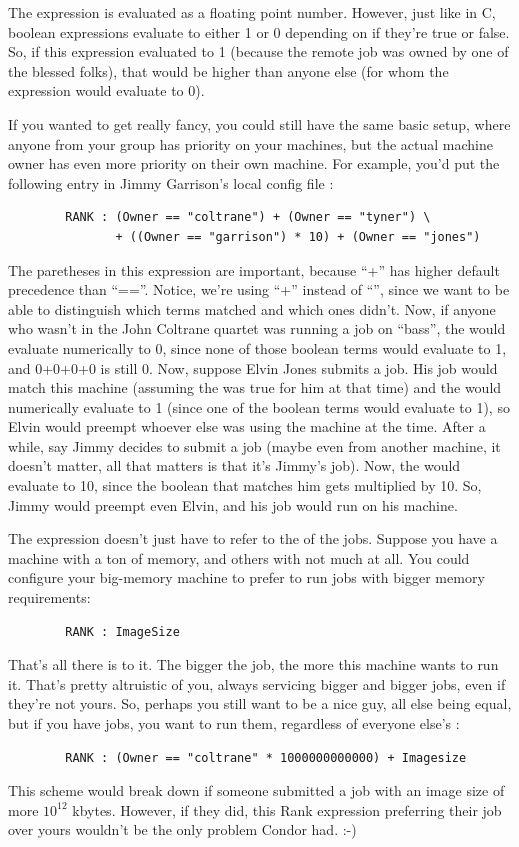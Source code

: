 The  expression is evaluated as a floating point number.
However, just like in C, boolean expressions evaluate to either 1 or 0
depending on if they're true or false.  So, if this expression
evaluated to 1 (because the remote job was owned by one of the blessed
folks), that would be higher than anyone else (for whom the expression
would evaluate to 0).

If you wanted to get really fancy, you could still have the same basic
setup, where anyone from your group has priority on your machines, but
the actual machine owner has even more priority on their own machine.
For example, you'd put the following entry in Jimmy Garrison's local
config file :
\begin{verbatim}
        RANK : (Owner == "coltrane") + (Owner == "tyner") \
               + ((Owner == "garrison") * 10) + (Owner == "jones")
\end{verbatim}
\Note The paretheses in this expression are important, because ``+''
               has higher default precedence than ``==''.
Notice, we're using ``+'' instead of ``\Bar\Bar'', since we want to be able
to distinguish which terms matched and which ones didn't.  Now, if
anyone who wasn't in the John Coltrane quartet was running a job on
``bass'', the \Expr{RANK} would evaluate numerically to 0, since none
of those boolean terms would evaluate to 1, and 0+0+0+0 is still 0.
Now, suppose Elvin Jones submits a job.  His job would match this
machine (assuming the \Expr{START} was true for him at that time) and
the \Expr{RANK} would numerically evaluate to 1 (since one of the
boolean terms would evaluate to 1), so Elvin would preempt whoever
else was using the machine at the time.  After a while, say Jimmy
decides to submit a job (maybe even from another machine, it doesn't
matter, all that matters is that it's Jimmy's job).  Now, the
 would evaluate to 10, since the boolean that matches him
gets multiplied by 10.  So, Jimmy would preempt even Elvin, and his
job would run on his machine.

The  expression doesn't just have to refer to the
 of the jobs.  Suppose you have a machine with a ton of
memory, and others with not much at all.  You could configure your
big-memory machine to prefer to run jobs with bigger memory
requirements:
\begin{verbatim}
        RANK : ImageSize
\end{verbatim}

That's all there is to it.  The bigger the job, the more this machine
wants to run it.  That's pretty altruistic of you, always servicing
bigger and bigger jobs, even if they're not yours.  So, perhaps you
still want to be a nice guy, all else being equal, but if you have
jobs, you want to run them, regardless of everyone else's
:
\begin{verbatim}
        RANK : (Owner == "coltrane" * 1000000000000) + Imagesize
\end{verbatim}
This scheme would break down if someone submitted a job with an image
size of more $10^{12}$ kbytes.  However, if they did, this Rank expression
preferring their job over yours wouldn't be the only problem Condor
had. :-)


